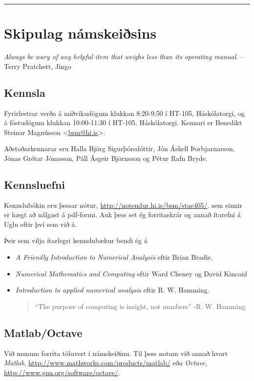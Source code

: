 \documentclass[letterpaper,10pt,icelandic]{sphinxmanual}
\begin{document}
\bigskip\hrule{}\bigskip

\newpage

\section{Skipulag námskeiðsins}
\label{vidauki:skipulag-namskeisins}
\emph{Always be wary of any helpful item that weighs less than its operating manual.}
-- Terry Pratchett, Jingo


\subsection{Kennsla}
\label{vidauki:kennsla}
Fyrirlestrar verða á miðvikudögum klukkan 8:20-9:50 í HT-105, Háskólatorgi, og á föstudögum klukkan 10:00-11:30 í HT-105, Háskólatorgi.
Kennari er Benedikt Steinar Magnússon \textless{}\href{mailto:bsm@hi.is}{bsm@hi.is}\textgreater{}.

Aðstoðarkennarar eru Halla Björg Sigurþórsdóttir, Jón Áskell Þorbjarnarson, Jónas Grétar Jónasson, Páll Ásgeir Björnsson og Pétur Rafn Bryde.


\subsection{Kennsluefni}
\label{vidauki:kennsluefni}
Kennslubókin eru þessar nótur, \href{http://notendur.hi.is/bsm/stae405/}{http://notendur.hi.is/bsm/stae405/}. sem einnir er hægt að nálgast á pdf-formi. Auk þess set ég forritaskrár og annað ítarefni á Uglu eftir því sem við á.

Þeir sem vilja ítarlegri kennslubækur bendi ég á
\begin{itemize}
\item {} 
\emph{A Friendly Introduction to Numerical Analysis} eftir Brian Bradie.

\item {} 
\emph{Numerical Mathematics and Computing} eftir Ward Cheney og David Kincaid

\item {} 
\emph{Introduction to applied numerical analysis} eftir R. W. Hamming.
\begin{quote}

``The purpose of computing is insight, not numbers'' -R. W. Hamming
\end{quote}

\end{itemize}


\subsection{Matlab/Octave}
\label{vidauki:matlab-octave}
Við munum forrita töluvert í námskeiðinu. Til þess notum við annað hvort \emph{Matlab}, \href{http://www.mathworks.com/products/matlab/}{http://www.mathworks.com/products/matlab/} eða \emph{Octave}, \href{http://www.gnu.org/software/octave/}{http://www.gnu.org/software/octave/}.
\end{document}
